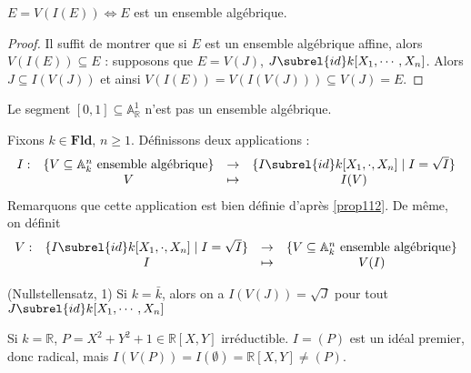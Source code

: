             \begin{lemm}
                $E = V(I(E)) \iff E$ est un ensemble algébrique. 
            \end{lemm}
            \begin{proof}
                Il suffit de montrer que si $E$ est un ensemble algébrique affine, alors \linebreak $V(I(E)) \subseteq E$ : supposons que $E = V(J)$, $J \subrel{id} k[X_1, \cdots, X_n]$. Alors $J \subseteq I(V(J))$ et ainsi $V(I(E)) = V(I(V(J))) \subseteq V(J) = E$.
            \end{proof}
            \begin{expl}
                Le segment $[0,1] \subseteq \mathbb{A}_\mathbb{R}^1$ n'est pas un ensemble algébrique.
            \end{expl}
            Fixons $k \in \mathbf{Fld}$, $n \geq 1$. Définissons deux applications :
            \begin{align*}
                \begin{array}{cccc}
                    I : & \{V \subseteq \mathbb{A}_k^n \text{ ensemble algébrique}\} & \to & \{I \subrel{id} k[X_1, \cdot, X_n] \mid I = \sqrt{I} \} \\
                    & V & \mapsto & I(V)\\
                \end{array}
            \end{align*}
            Remarquons que cette application est bien définie d'après \ref{prop112}. De même, on définit
            \begin{align*}
                \begin{array}{cccc}
                    V : & \{I \subrel{id} k[X_1, \cdot, X_n] \mid I = \sqrt{I} \} & \to & \{V \subseteq \mathbb{A}_k^n \text{ ensemble algébrique}\} \\
                    & I & \mapsto & V(I) \\
                \end{array}
            \end{align*}
            \begin{theo} (Nullstellensatz, 1)
                \label{Null_1}
                Si $k = \bar k$, alors on a $I(V(J)) = \sqrt{J}$ pour tout $J \subrel{id} k[X_1, \cdots, X_n]$
            \end{theo}
            \begin{expl}
                Si $k = \mathbb{R}$, $P = X^2 + Y^2 + 1 \in \mathbb{R}[X,Y]$ irréductible. $I = (P)$ est un idéal premier, donc radical, mais $I(V(P)) = I(\emptyset) = \mathbb{R}[X,Y] \neq (P)$.
            \end{expl}
